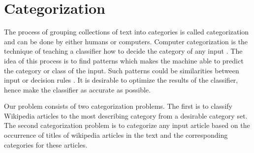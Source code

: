 \section{Categorization}
The process of grouping collections of text into categories is called categorization and can be done by either humans or computers. Computer categorization is the technique of teaching a classifier how to decide the category of any input \cite{wiki:categorization}. The idea of this process is to find patterns which makes the machine able to predict the category or class of the input. Such patterns could be similarities between input or decision rules \cite{wiki:classification}. It is desirable to optimize the results of the classifier, hence make the classifier as accurate as possible. 



Our problem consists of two categorization problems. The first is to classify Wikipedia articles to the most describing category from a desirable category set. The second categorization problem is to categorize any input article based on the occurrence of titles of wikipedia articles in the text and the corresponding categories for these articles. 

